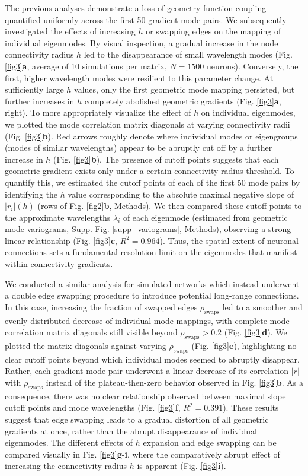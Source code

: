 \documentclass{article}
\begin{document}
The previous analyses demonstrate a loss of geometry-function coupling quantified uniformly across the first 50 gradient-mode pairs. We subsequently investigated the effects of increasing $h$ or swapping edges on the mapping of individual eigenmodes. By visual inspection, a gradual increase in the node connectivity radius $h$ led to the disappearance of small wavelength modes (Fig. \ref{fig3}\textbf{a}, average of 10 simulations per matrix, $N=1500$ neurons). Conversely, the first, higher wavelength modes were resilient to this parameter change. At sufficiently large $h$ values, only the first geometric mode mapping persisted, but further increases in $h$ completely abolished geometric gradients (Fig. \ref{fig3}\textbf{a}, right). To more appropriately visualize the effect of $h$ on individual eigenmodes, we plotted the mode correlation matrix diagonals at varying connectivity radii (Fig. \ref{fig3}\textbf{b}). Red arrows roughly denote where individual modes or eigengroups (modes of similar wavelengths) appear to be abruptly cut off by a further increase in $h$ (Fig. \ref{fig3}\textbf{b}). The presence of cutoff points suggests that each geometric gradient exists only under a certain connectivity radius threshold. To quantify this, we estimated the cutoff points of each of the first 50 mode pairs by identifying the $h$ value corresponding to the absolute maximal negative slope of $|r_i|(h)$ (rows of Fig. \ref{fig2}\textbf{b}, Methods). We then compared these cutoff points to the approximate wavelengths $\lambda_i$ of each eigenmode (estimated from geometric mode variograms, Supp. Fig. \ref{supp_variograms}, Methods), observing a strong linear relationship (Fig. \ref{fig3}\textbf{c}, $R^2=0.964$). Thus, the spatial extent of neuronal connections sets a fundamental resolution limit on the eigenmodes that manifest within connectivity gradients.

We conducted a similar analysis for simulated networks which instead underwent a double edge swapping procedure to introduce potential long-range connections. In this case, increasing the fraction of swapped edges $\rho_{\text{swaps}}$ led to a smoother and evenly distributed decrease of individual mode mappings, with complete mode correlation matrix diagonals still visible beyond $\rho_{\text{swaps}}>0.2$ (Fig. \ref{fig3}\textbf{d}). We plotted the matrix diagonals against varying $\rho_{\text{swaps}}$ (Fig. \ref{fig3}\textbf{e}), highlighting no clear cutoff points beyond which individual modes seemed to abruptly disappear. Rather, each gradient-mode pair underwent a linear decrease of its correlation $|r|$ with $\rho_{\text{swaps}}$ instead of the plateau-then-zero behavior observed in Fig. \ref{fig3}\textbf{b}. As a consequence, there was no clear relationship observed between maximal slope cutoff points and mode wavelengths (Fig. \ref{fig3}\textbf{f}, $R^2=0.391$). These results suggest that edge swapping leads to a gradual distortion of all geometric gradients at once, rather than the abrupt disappearance of individual eigenmodes. The different effects of $h$ expansion and edge swapping can be compared visually in Fig. \ref{fig3}\textbf{g}-\textbf{i}, where the comparatively abrupt effect of increasing the connectivity radius $h$ is apparent (Fig. \ref{fig3}\textbf{i}).
\end{document}
